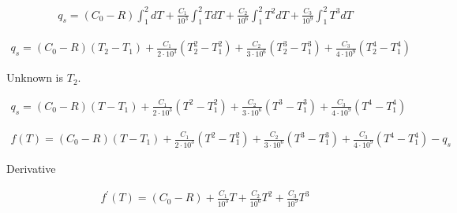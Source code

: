 \documentclass{article}
\begin{document}
	\begin{align*}
		q_s = (C_0 - R)\int_1^2 dT + \frac{C_1}{10^3}\int_1^2 TdT + \frac{C_2}{10^6}\int_1^2 T^2dT + \frac{C_3}{10^9}\int_1^2 T^3dT
	\end{align*}

	\begin{align*}
		q_s = (C_0 - R)(T_2 - T_1) + \frac{C_1}{2\cdot10^3}(T_2^2 - T_1^2) + \frac{C_2}{3\cdot10^6}(T_2^3 - T_1^3) + \frac{C_3}{4\cdot10^9}(T_2^4 - T_1^4)
	\end{align*}

	Unknown is $T_2$.

	\begin{align*}
		q_s = (C_0 - R)(T - T_1) + \frac{C_1}{2\cdot10^3}(T^2 - T_1^2) + \frac{C_2}{3\cdot10^6}(T^3 - T_1^3) + \frac{C_3}{4\cdot10^9}(T^4 - T_1^4)
	\end{align*}

	\begin{align*}
		f(T) = (C_0 - R)(T - T_1) + \frac{C_1}{2\cdot10^3}(T^2 - T_1^2) + \frac{C_2}{3\cdot10^6}(T^3 - T_1^3) + \frac{C_3}{4\cdot10^9}(T^4 - T_1^4) - q_s
	\end{align*}

	Derivative

	\begin{align*}
		f^\prime(T) = (C_0 - R) + \frac{C_1}{10^3}T + \frac{C_2}{10^6}T^2 + \frac{C_3}{10^9}T^3
	\end{align*}

	
	
\end{document}
